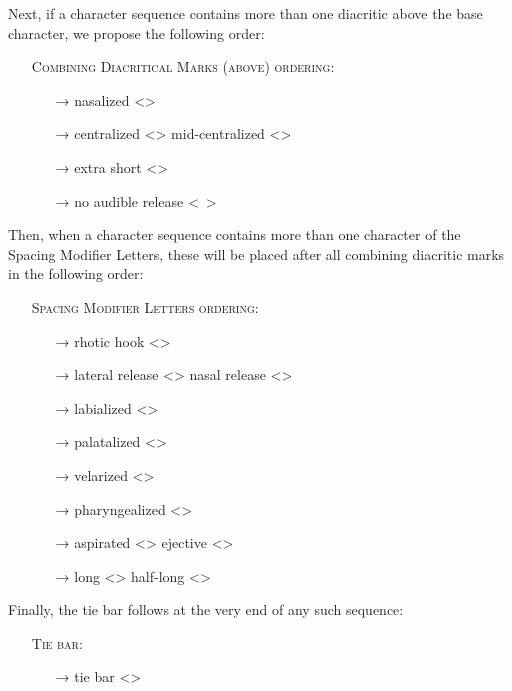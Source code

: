 \noindent Next, if a character sequence contains more than one diacritic above the base
character, we propose the following order:

\begin{itemize}
	\item[] \textsc{Combining Diacritical Marks (above) ordering:}
	\begin{itemize}
	  \item[→] nasalized <>
	  \item[→] centralized <> \textbar{} mid-centralized <>
	  \item[→] extra short <>
	  \item[→] no audible release <\ >
 \end{itemize} \end{itemize}

\noindent Then, when a character sequence contains more than one character of the Spacing
Modifier Letters, these will be placed after all combining diacritic marks in the
following order:

\begin{itemize}
	\item[] \textsc{Spacing Modifier Letters ordering:}
	\begin{itemize}
	  \item[→] rhotic hook <>
	  \item[→] lateral release <> \textbar{} nasal release <>
	  \item[→] labialized <>
	  \item[→] palatalized <>
	  \item[→] velarized <>
	  \item[→] pharyngealized <>
	  \item[→] aspirated <> \textbar{} ejective <>
	  \item[→] long <> \textbar{} half-long <>
	\end{itemize}
\end{itemize}

\noindent Finally, the tie bar follows at the very end of any such sequence:

\begin{itemize}
  \item[] \textsc{Tie bar:}
  \begin{itemize}
    \item[→] tie bar <>
  \end{itemize}
\end{itemize}

